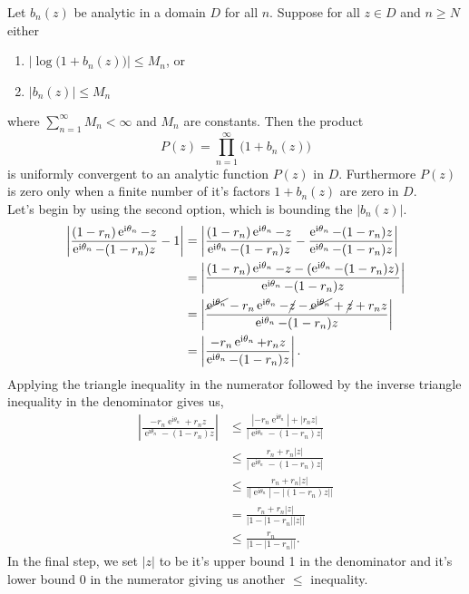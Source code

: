 \documentclass[10pt]{amsart}
\newcommand{\I}{\mathrm{i}}
\DeclareMathOperator{\E}{e}
\theoremstyle{nonumberplain}
\begin{document}
\begin{enumerate}[label={\bf {\arabic*}:}]
\begin{itemize}
\noindent
Let $b_n(z)$ be analytic in a domain $D$ for all $n$.
Suppose for all $z \in D$ and $n \geq N$ either
\begin{enumerate}
\item $\big|\log \big(1 + b_n(z)\big)\big| \leq M_n$, or
\item $\big|b_n(z)\big| \leq M_n$
\end{enumerate}
where $\sum_{n = 1}^\infty M_n < \infty$ and $M_n$ are constants.
Then the product
$$P (z) = \prod_{n=1}^\infty \big(1 + b_n(z)\big)$$
is uniformly convergent to an analytic function $P(z)$ in $D$.
Furthermore $P(z)$ is zero only when a finite number of it's factors $1 + b_n(z)$ are zero in $D$. \\

\noindent
Let's begin by using the second option, which is bounding the $|b_n(z)|$.
\begin{align*}
\left|\frac{ (1 - r_n)\E^{\I \theta_n} - z}{ \E^{\I \theta_n} - (1 - r_n) z} - 1 \right| 
	&= \left|\frac{ (1 - r_n)\E^{\I \theta_n} - z}{ \E^{\I \theta_n} - (1 - r_n) z} - \frac{\E^{\I \theta_n} - (1 - r_n) z}{\E^{\I \theta_n} - (1 - r_n) z}\right| \\
	&= \left|\frac{ (1 - r_n)\E^{\I \theta_n} - z - (\E^{\I \theta_n} - (1 - r_n) z)}{ \E^{\I \theta_n} - (1 - r_n) z} \right| \\
	&= \left|\frac{ \cancel{\E^{\I \theta_n}} - r_n\E^{\I \theta_n} - \cancel{z} - \cancel{\E^{\I \theta_n}} + \cancel{z} + r_n z}{ \E^{\I \theta_n} - (1 - r_n) z} \right| \\
	&= \left|\frac{ - r_n\E^{\I \theta_n} + r_n z}{ \E^{\I \theta_n} - (1 - r_n) z} \right|.
\end{align*}
Applying the triangle inequality in the numerator followed by the inverse triangle inequality in the denominator gives us,
\begin{align*}
\left|\frac{ - r_n\E^{\I \theta_n} + r_n z}{ \E^{\I \theta_n} - (1 - r_n) z} \right|
	&\leq \frac{ |-r_n\E^{\I \theta_n}| + |r_n z|}{ \left|\E^{\I \theta_n} - (1 - r_n) z \right|} \\
	&\leq \frac{ r_n + r_n |z|}{ \left|\E^{\I \theta_n} - (1 - r_n) z \right|} \\
	&\leq \frac{ r_n + r_n |z|}{ \big| |\E^{\I \theta_n}| - |(1 - r_n) z| \big|} \\
	&= \frac{ r_n + r_n |z|}{ \big| 1 - |1 - r_n| |z| \big|} \\
	&\leq \frac{ r_n}{ \big| 1 - |1 - r_n|\big|}.
\end{align*}
In the final step,  we set $|z|$ to be it's upper bound 1 in the denominator and it's lower bound 0 in the numerator giving us another $\leq$ inequality.

\end{itemize}
\end{enumerate}
\end{document}
